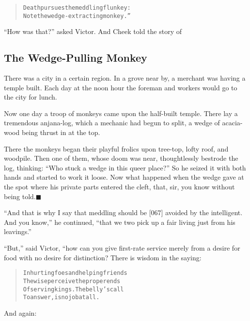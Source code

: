 \documentclass[article, twoside, 14pt]{memoir}
\newcommand{\qed}{\hfill \ensuremath{\blacksquare}}
\renewenvironment{verbatim}{%
\begin{quote}%
\vskip -10pt%
\begin{alltt}\normalfont\large}{\end{alltt}%
\end{quote}%
\vskip -10pt
} %
\begin{document}
\begin{verbatim}
Death pursues the meddling flunkey:
Note the wedge-extracting monkey.”
\end{verbatim}
``How was that?'' asked Victor. And Cheek told the story of

\subsection{The Wedge-Pulling Monkey}

\label{s2}

There was a city in a certain region. In a grove near by, a
merchant was having a temple built. Each day at the noon hour the
foreman and workers would go to the city for lunch.

Now one day a troop of monkeys came upon the half-built temple.
There lay a tremendous anjana-log, which a mechanic had begun to
split, a wedge of acacia-wood being thrust in at the top.

There the monkeys began their playful frolics upon tree-top, lofty
roof, and woodpile. Then one of them, whose doom was near,
thoughtlessly bestrode the log, thinking:
``Who stuck a wedge in this queer place?'' So he seized it with
both hands and started to work it loose. Now what happened when the
wedge gave at the spot where his private parts entered the cleft,
that, sir, you know without being told.\hyperref[s2]{\qed}

``And that is why I say that meddling should be [067] avoided by the intelligent. And you know,''
he continued,
``that we two pick up a fair living just from his leavings.''

``But,'' said Victor, “how can you give first-rate service merely
from a desire for food with no desire for distinction? There is
wisdom in the saying:

\begin{verbatim}
In hurting foes and helping friends
The wise perceive the proper ends
Of serving kings. The belly's call
To answer, is no job at all.
\end{verbatim}
And again:
\end{document}
